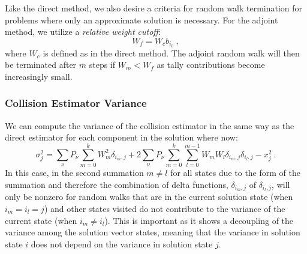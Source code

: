 Like the direct method, we also desire a criteria for random walk
termination for problems where only an approximate solution is
necessary. For the adjoint method, we utilize a \textit{relative
  weight cutoff}:
\begin{equation}
  W_f = W_c b_{i_0}\:,
  \label{eq:relative_weight_cutoff}
\end{equation}
where $W_c$ is defined as in the direct method. The adjoint random
walk will then be terminated after $m$ steps if $W_m < W_f$ as tally
contributions become increasingly small.

\subsubsection{Collision Estimator Variance}
\label{subsec:forward_variance}
We can compute the variance of the collision estimator in the same way
as the direct estimator for each component in the solution where now:
\begin{equation}
  \sigma_j^2 = \sum_{\nu} P_{\nu} \sum_{m=0}^k W_{m}^2 \delta_{i_m,j}
  + 2 \sum_{\nu} P_{\nu} \sum_{m=0}^k \sum_{l=0}^{m-1} W_m W_l
  \delta_{i_m,j} \delta_{i_l,j} - x_j^2\:.
  \label{eq:collision_variance_1}
\end{equation}
In this case, in the second summation $m \neq l$ for all states due to
the form of the summation and therefore the combination of delta
functions, $\delta_{i_m,j}$ of $\delta_{i_l,j}$, will only be nonzero
for random walks that are in the current solution state (when $i_m =
i_l = j$) and other states visited do not contribute to the variance
of the current state (when $i_m \neq i_l$). This is important as it
shows a decoupling of the variance among the solution vector states,
meaning that the variance in solution state $i$ does not depend on the
variance in solution state $j$.

